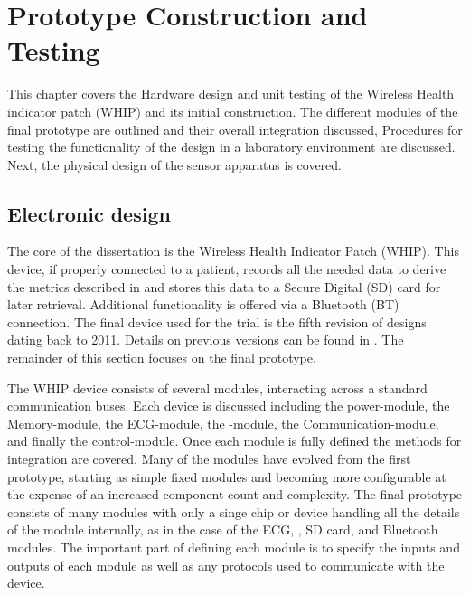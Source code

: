 \chapter{Prototype Construction and Testing}
\label{chap:ProtoTypeBuildTest}


This chapter covers the Hardware design and unit testing of the Wireless Health indicator patch (WHIP) and its initial construction. The different modules of the final prototype are outlined and their overall integration discussed, Procedures for testing the functionality of the design in a laboratory environment are discussed. Next, the physical design of the sensor apparatus is covered.

\section{Electronic design}


The core of the dissertation is the Wireless Health Indicator Patch (WHIP). This device, if properly connected to a patient, records all the needed data to derive the metrics described in  and stores this data to a Secure Digital (SD) card for later retrieval. Additional functionality is offered via a Bluetooth (BT) connection. The final device used for the trial is the fifth revision of designs dating back to 2011. Details on previous versions can be found in . The remainder of this section focuses on the final prototype.

The WHIP device consists of several modules, interacting across a standard communication buses. Each device is discussed including the power-module, the Memory-module, the ECG-module, the -module, the Communication-module, and finally the control-module. Once each module is fully defined the methods for integration are covered. Many of the modules have evolved from the first prototype, starting as simple fixed modules and becoming more configurable at the expense of an increased component count and complexity. The final prototype consists of many modules with only a singe chip or device handling all the details of the module internally, as in the case of the ECG, , SD card, and Bluetooth modules. The important part of defining each module is to specify the inputs and outputs of each module as well as any protocols used to communicate with the device.

